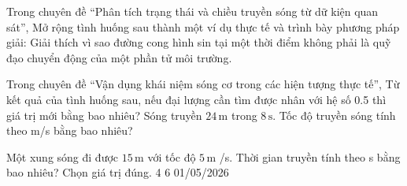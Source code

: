 \begin{ex}
Trong chuyên đề “Phân tích trạng thái và chiều truyền sóng từ dữ kiện quan sát”, Mở rộng tình huống sau thành một ví dụ thực tế và trình bày phương pháp giải: Giải thích vì sao đường cong hình sin tại một thời điểm không phải là quỹ đạo chuyển động của một phần tử môi trường.
\choiceTF

\end{ex}

\begin{ex}
Trong chuyên đề “Vận dụng khái niệm sóng cơ trong các hiện tượng thực tế”, Từ kết quả của tình huống sau, nếu đại lượng cần tìm được nhân với hệ số 0.5 thì giá trị mới bằng bao nhiêu? Sóng truyền $24\,\text{m}$ trong $8\,\text{s}$. Tốc độ truyền sóng tính theo m/s bằng bao nhiêu?
\end{ex}

\begin{ex}
Một xung sóng đi được $15\,\text{m}$ với tốc độ $5\,\text{m}$ /s. Thời gian truyền tính theo s bằng bao nhiêu? Chọn giá trị đúng.
\choice
{4}
{}
{6}
{01/05/2026}
\end{ex}

